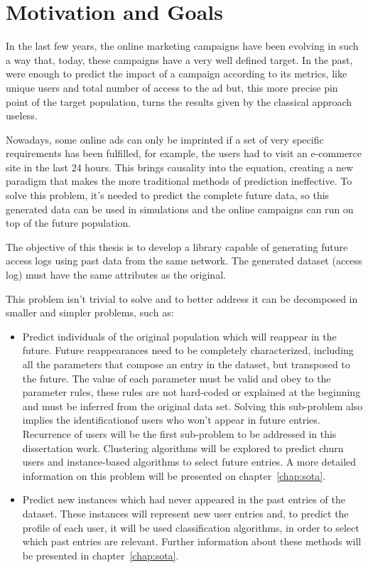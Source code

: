 \section{Motivation and Goals} \label{sec:goals}

In the last few years, the online marketing campaigns have been evolving in such a way that, today, these campaigns have a very well defined target.
In the past, were enough to predict the impact of a campaign according to its metrics, like unique users and total number of access to the ad but, this more precise pin point of the target population, turns the results given by the classical approach useless.

Nowadays, some online ads can only be imprinted if a set of very specific requirements has been fulfilled, for example,
the users had to visit an e-commerce site in the last 24 hours. This brings causality into the equation, creating a new paradigm that makes 
the more traditional methods of prediction ineffective. To solve this problem, it's needed to predict the complete future data, so this generated data
can be used in simulations and the online campaigns can run on top of the future population.

The objective of this thesis is to develop a library capable of generating future access logs using past data from the same network.
The generated dataset (access log) must have the same attributes as the original.

This problem isn't trivial to solve and to better address it can be decomposed in smaller and simpler problems, such as:
\begin{itemize}
    \item Predict individuals of the original population which will reappear in the future. Future reappearances need to be completely characterized, including 
      all the parameters that compose an entry in the dataset, but transposed to the future. The value of each parameter must be valid and obey to the parameter
      rules, these rules are not hard-coded or explained at the beginning and must be inferred from the original data set. Solving this sub-problem also implies the identificationof users who won't appear in future entries. Recurrence of users will be the first sub-problem to be addressed in this dissertation work. 
      Clustering algorithms will be explored to predict churn users and instance-based algorithms to select future entries. A more detailed information
      on this problem will be presented on chapter~\ref{chap:sota}.
    \item Predict new instances which had never appeared in the past entries of the dataset.
      These instances will represent new user entries and, to predict the profile of each user, it will be used classification algorithms, in order to select 
      which past entries are relevant. Further information about these methods will be presented in
      chapter~\ref{chap:sota}.
\end{itemize}


